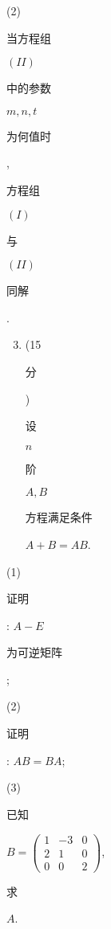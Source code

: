 \documentclass[10pt]{article}
\begin{document}
(2) \begin{CJK}{UTF8}{mj}当方程组\end{CJK} $(I I)$ \begin{CJK}{UTF8}{mj}中的参数\end{CJK} $m, n, t$ \begin{CJK}{UTF8}{mj}为何值时\end{CJK}, \begin{CJK}{UTF8}{mj}方程组\end{CJK} $(I)$ \begin{CJK}{UTF8}{mj}与\end{CJK} $(I I)$ \begin{CJK}{UTF8}{mj}同解\end{CJK}.

\begin{enumerate}
  \setcounter{enumi}{2}
  \item (15 \begin{CJK}{UTF8}{mj}分\end{CJK}) \begin{CJK}{UTF8}{mj}设\end{CJK} $n$ \begin{CJK}{UTF8}{mj}阶\end{CJK} $A, B$ \begin{CJK}{UTF8}{mj}方程满足条件\end{CJK} $A+B=A B$.
\end{enumerate}
(1) \begin{CJK}{UTF8}{mj}证明\end{CJK}: $A-E$ \begin{CJK}{UTF8}{mj}为可逆矩阵\end{CJK};

(2) \begin{CJK}{UTF8}{mj}证明\end{CJK}: $A B=B A$;

(3) \begin{CJK}{UTF8}{mj}已知\end{CJK} $B=\left(\begin{array}{ccc}1 & -3 & 0 \\ 2 & 1 & 0 \\ 0 & 0 & 2\end{array}\right)$, \begin{CJK}{UTF8}{mj}求\end{CJK} $A$.
\end{document}
